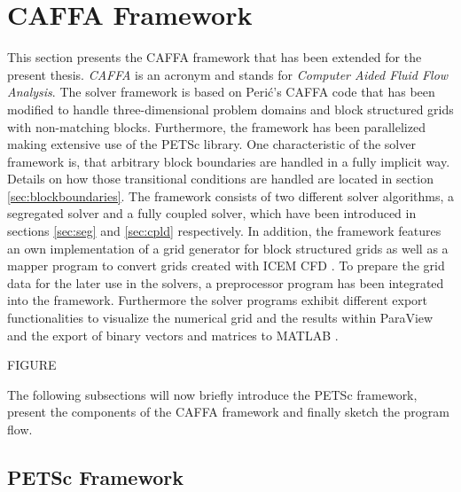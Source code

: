 \section{CAFFA Framework}

This section presents the CAFFA framework that has been extended for the present thesis. \emph{CAFFA} is an acronym and stands for \emph{Computer Aided Fluid Flow Analysis}. The solver framework is based on Peri\'c's CAFFA code \cite{caffawebpage,caffa3dwebpage} that has been modified to handle three-dimensional problem domains and block structured grids with non-matching blocks. Furthermore, the framework has been parallelized making extensive use of the PETSc library. One characteristic of the solver framework is, that arbitrary block boundaries are handled in a fully implicit way. Details on how those transitional conditions are handled are located in section \ref{sec:blockboundaries}. The framework consists of two different solver algorithms, a segregated solver and a fully coupled solver, which have been introduced in sections \ref{sec:seg} and \ref{sec:cpld} respectively. In addition, the framework features an own implementation of a grid generator for block structured grids as well as a mapper program to convert grids created with ICEM CFD \cite{icemdfd}. To prepare the grid data for the later use in the solvers, a preprocessor program has been integrated into the framework. Furthermore the solver programs exhibit different export functionalities to visualize the numerical grid and the results within ParaView \cite{paraview} and the export of binary vectors and matrices to MATLAB \textregistered \cite{matlab}.

FIGURE

The following subsections will now briefly introduce the PETSc framework, present the components of the CAFFA framework and finally sketch the program flow.

\subsection{PETSc Framework}

